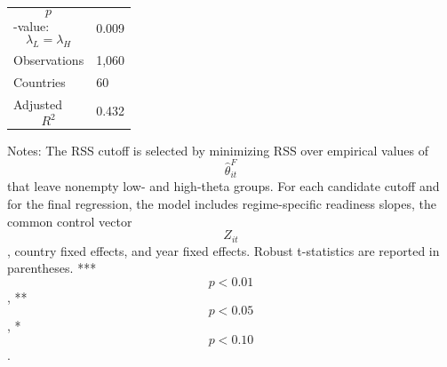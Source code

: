 \begin{table}[H]
\begin{threeparttable}
\begin{tabularx}{\textwidth}{lY}
$$p$$-value: $$\lambda_L=\lambda_H$$ & 0.009 \\
Observations & 1,060 \\
Countries & 60 \\
Adjusted $$R^2$$ & 0.432 \\
\bottomrule
\end{tabularx}
\begin{tablenotes}[flushleft]\footnotesize
\item Notes: The RSS cutoff is selected by minimizing RSS over empirical values of $$\widehat{\theta}^{F}_{it}$$ that leave nonempty low- and high-theta groups. For each candidate cutoff and for the final regression, the model includes regime-specific readiness slopes, the common control vector $$Z_{it}$$, country fixed effects, and year fixed effects. Robust t-statistics are reported in parentheses. *** $$p<0.01$$, ** $$p<0.05$$, * $$p<0.10$$.
\end{tablenotes}
\end{threeparttable}
\end{table}
